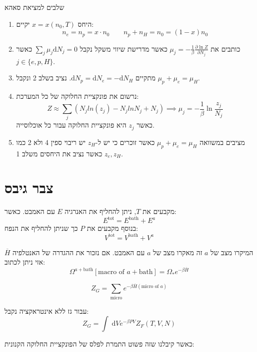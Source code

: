 \documentclass{tstextbook}
\begin{document}
\begin{summary}
שלבים למציאת סאהא

  \begin{enumerate}
    \item היחס \(x=x(n_{0},T)\) יקיים: 
$$n_{e}=n_{p}=x\cdot n_{0}\qquad n_{p}+n_{H}=n_{0}=(1-x)n_{0}$$


    \item כותבים את \(\mu_{j}=-\frac{1}{\beta}\frac{\partial \ln Z}{\partial N_{j}}\) כאשר מדרישת שיווי משקל נקבל \(\sum_{j}\mu_{j}\mathrm{d}N_{j}=0\) כאשר \(j \in \{ e,p,H \}\).  


    \item מתקיים \(\mathrm{d}N_{p}=\mathrm{d}N_{e}=-\mathrm{d}N_{H}\). נציב בשלב 2 ונקבל \(\mu_{p}+\mu_{e}=\mu_{H}\). 


    \item נרשום את פונקציית החלוקה של כל המערכת: 
$$Z\approx\sum_{j}\left(N_{j}l n\left(z_{j}\right)-N_{j}l n N_{j}+N_{j}\right)\implies \mu_{j}=-\frac{1}{\beta}\ln \frac{z_{j}}{N_{j}}$$
כאשר \(z_{j}\) היא פונקציית החלוקה עבור כל אוכלוסייה.


    \item מציבים במשוואה \(\mu_{p}+\mu_{e}=\mu_{H}\) כאשר זוכרים כי יש ל-\(z_{H}\) יש ריבוי ספין 4 ולא 2 כמו \(z_{e},z_{H}\) כאשר נציב את היחסים משלב 1. 


  \end{enumerate}
\end{summary}
\section{צבר גיבס}

\begin{definition}
מקבעים את \(T\), ניתן להחליף את האנרגיה \(E\) עם האמבט. כאשר:
$$E^{\text{tot}}=E^{\text{bath}}+E^{a}$$
בנוסף מקבעים את \(P\) כך שניתן להחליף את הנפח:
$$V^{\text{tot}}=V^{\text{bath}}+V^{a}$$

\end{definition}
\begin{proposition}
המיקרו מצב של \(a\) זה מאקרו מצב של \(a\) עם האמבט. אם נזכור את ההגדרה של האנטלפיה \(\overline{H}\) אזי ניתן לכתוב:
$$\Omega^{a+\text{bath}}[\text{macro of }a +\text{bath}]=\Omega_{*}e^{ -\beta \overline{H}  }$$

\end{proposition}
\begin{definition}
$$Z_{G}=\sum_{\text{micro}} e^{ -\beta \overline{H} (\text{micro of }a) }$$

\end{definition}
\begin{proposition}
עבור גז ללא אינטראקציה נקבל:
$$Z_{G}=\int  \;\mathrm{d}V e^{ -\beta PV }Z_{F}(T,V,N)$$

\end{proposition}
כאשר קיבלנו שזה פשוט התמרת לפלס של הפונקציית החלוקה הקנונית:
\end{document}
